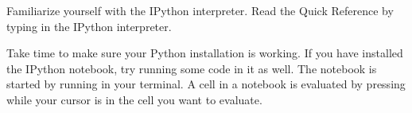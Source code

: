 \begin{problem}
Familiarize yourself with the IPython interpreter.
Read the Quick Reference by typing  in the IPython interpreter.

Take time to make sure your Python installation is working.
If you have installed the IPython notebook, try running some code in it as well.
The notebook is started by running  in your terminal.
A cell in a notebook is evaluated by pressing  while your cursor is in the cell you want to evaluate.
\end{problem}
